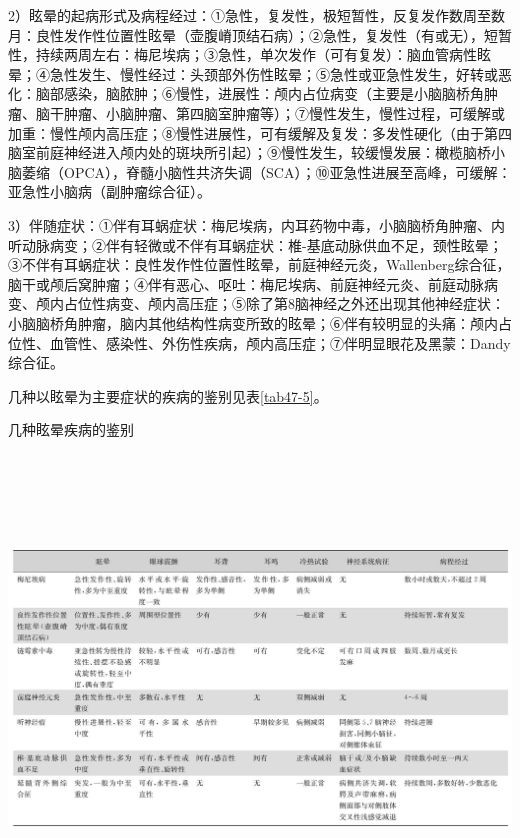 2）眩晕的起病形式及病程经过：①急性，复发性，极短暂性，反复发作数周至数月：良性发作性位置性眩晕（壶腹嵴顶结石病）；②急性，复发性（有或无），短暂性，持续两周左右：梅尼埃病；③急性，单次发作（可有复发）：脑血管病性眩晕；④急性发生、慢性经过：头颈部外伤性眩晕；⑤急性或亚急性发生，好转或恶化：脑部感染，脑脓肿；⑥慢性，进展性：颅内占位病变（主要是小脑脑桥角肿瘤、脑干肿瘤、小脑肿瘤、第四脑室肿瘤等）；⑦慢性发生，慢性过程，可缓解或加重：慢性颅内高压症；⑧慢性进展性，可有缓解及复发：多发性硬化（由于第四脑室前庭神经进入颅内处的斑块所引起）；⑨慢性发生，较缓慢发展：橄榄脑桥小脑萎缩（OPCA），脊髓小脑性共济失调（SCA）；⑩亚急性进展至高峰，可缓解：亚急性小脑病（副肿瘤综合征）。

3）伴随症状：①伴有耳蜗症状：梅尼埃病，内耳药物中毒，小脑脑桥角肿瘤、内听动脉病变；②伴有轻微或不伴有耳蜗症状：椎-基底动脉供血不足，颈性眩晕；③不伴有耳蜗症状：良性发作性位置性眩晕，前庭神经元炎，Wallenberg综合征，脑干或颅后窝肿瘤；④伴有恶心、呕吐：梅尼埃病、前庭神经元炎、前庭动脉病变、颅内占位性病变、颅内高压症；⑤除了第8脑神经之外还出现其他神经症状：小脑脑桥角肿瘤，脑内其他结构性病变所致的眩晕；⑥伴有较明显的头痛：颅内占位性、血管性、感染性、外伤性疾病，颅内高压症；⑦伴明显眼花及黑蒙：Dandy综合征。

几种以眩晕为主要症状的疾病的鉴别见表\ref{tab47-5}。

\begin{table}[htbp]
\centering
\caption{几种眩晕疾病的鉴别}
\label{tab47-5}
\includegraphics[width=8.8125in,height=4.91667in]{./images/Image00301.jpg}
\end{table}


